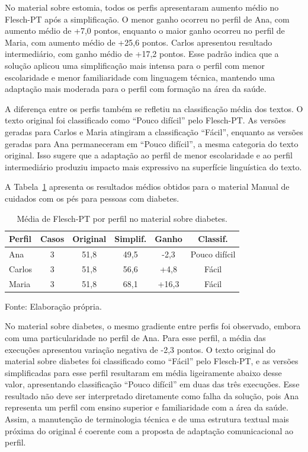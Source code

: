 No material sobre estomia, todos os perfis apresentaram aumento médio no Flesch-PT após a simplificação. O menor ganho ocorreu no perfil de Ana, com aumento médio de +7,0 pontos, enquanto o maior ganho ocorreu no perfil de Maria, com aumento médio de +25,6 pontos. Carlos apresentou resultado intermediário, com ganho médio de +17,2 pontos. Esse padrão indica que a solução aplicou uma simplificação mais intensa para o perfil com menor escolaridade e menor familiaridade com linguagem técnica, mantendo uma adaptação mais moderada para o perfil com formação na área da saúde.

A diferença entre os perfis também se refletiu na classificação média dos textos. O texto original foi classificado como ``Pouco difícil'' pelo Flesch-PT. As versões geradas para Carlos e Maria atingiram a classificação ``Fácil'', enquanto as versões geradas para Ana permaneceram em ``Pouco difícil'', a mesma categoria do texto original. Isso sugere que a adaptação ao perfil de menor escolaridade e ao perfil intermediário produziu impacto mais expressivo na superfície linguística do texto.

A Tabela~\ref{tab:flesch-diabetes} apresenta os resultados médios obtidos para o material Manual de cuidados com os pés para pessoas com diabetes.

\begin{table}[htbp]
  \centering
  \caption{Média de Flesch-PT por perfil no material sobre diabetes.}
  \label{tab:flesch-diabetes}
  \small
  \renewcommand{\arraystretch}{1.15}
  \begin{tabular}{lccccc}
    \hline
    \textbf{Perfil} & \textbf{Casos} & \textbf{Original} & \textbf{Simplif.} & \textbf{Ganho} & \textbf{Classif.} \\
    \hline
    Ana    & 3 & 51,8 & 49,5 & -2,3 & Pouco difícil \\
    Carlos & 3 & 51,8 & 56,6 & +4,8   & Fácil \\
    Maria  & 3 & 51,8 & 68,1 & +16,3  & Fácil \\
    \hline
  \end{tabular}

  {\footnotesize Fonte: Elaboração própria.}
\end{table}

No material sobre diabetes, o mesmo gradiente entre perfis foi observado, embora com uma particularidade no perfil de Ana. Para esse perfil, a média das execuções apresentou variação negativa de -2,3 pontos. O texto original do material sobre diabetes foi classificado como ``Fácil'' pelo Flesch-PT, e as versões simplificadas para esse perfil resultaram em média ligeiramente abaixo desse valor, apresentando classificação ``Pouco difícil'' em duas das três execuções. Esse resultado não deve ser interpretado diretamente como falha da solução, pois Ana representa um perfil com ensino superior e familiaridade com a área da saúde. Assim, a manutenção de terminologia técnica e de uma estrutura textual mais próxima do original é coerente com a proposta de adaptação comunicacional ao perfil.

